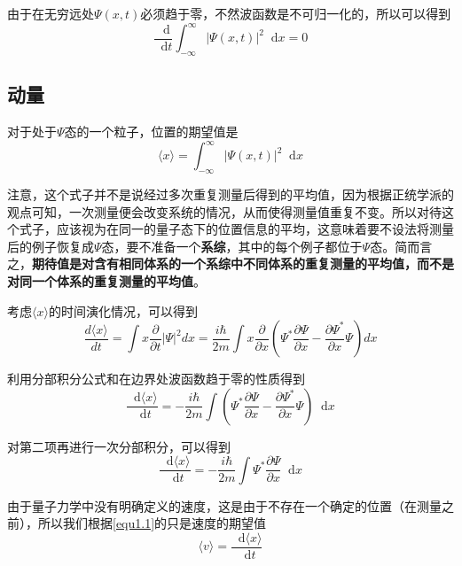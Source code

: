 \documentclass[UTF8]{ctexart}
\newcommand*{\dif}{\mathop{}\!\mathrm{d}}
\begin{document}
\noindent 由于在无穷远处$\Psi(x,t)$必须趋于零，不然波函数是不可归一化的，所以可以得到
    \begin{equation}
        \frac{\dif}{\dif t} \int_{-\infty}^{\infty} |\Psi(x,t)|^2 \dif x = 0 
    \end{equation}

    \subsection{动量}
    对于处于$\Psi$态的一个粒子，位置的期望值是
    \begin{equation}
        \langle x \rangle = \int_{-\infty}^{\infty} |\Psi (x,t)|^2 \dif x 
    \end{equation}

    注意，这个式子并不是说经过多次重复测量后得到的平均值，因为根据正统学派的观点可知，一次测量便会改变系统的情况，从而使得测量值重复不变。所以对待这个式子，应该视为在同一的量子态下的位置信息的平均，这意味着要不设法将测量后的例子恢复成$\Psi$态，要不准备一个\textbf{系综}，其中的每个例子都位于$\Psi$态。简而言之，\textbf{期待值是对含有相同体系的一个系综中不同体系的重复测量的平均值，而不是对同一个体系的重复测量的平均值}。

    考虑$\langle x \rangle$的时间演化情况，可以得到
    \begin{equation}
        \frac{d\langle x\rangle}{d t}=\int x \frac{\partial}{\partial t}|\Psi|^{2} d x=\frac{i \hbar}{2 m} \int x \frac{\partial}{\partial x}\left(\Psi^{*} \frac{\partial \Psi}{\partial x}-\frac{\partial \Psi^{*}}{\partial x} \Psi\right) d x
        \end{equation}

\noindent 利用分部积分公式和在边界处波函数趋于零的性质得到
    \begin{equation}
        \frac{\dif \langle x \rangle}{\dif t} = - \frac{i \hbar}{2m} \int \left(\Psi^* \frac{\partial \Psi}{\partial x} - \frac{\partial \Psi^*}{\partial x} \Psi\right) \dif x
    \end{equation}

\noindent 对第二项再进行一次分部积分，可以得到
    \begin{equation}
        \frac{\dif \langle x \rangle}{\dif t} = - \frac{i \hbar}{2m} \int \Psi^* \frac{\partial \Psi}{\partial x} \dif x \label{equ1.1}
    \end{equation}

    由于量子力学中没有明确定义的速度，这是由于不存在一个确定的位置（在测量之前），所以我们根据\autoref{equ1.1}的只是速度的期望值
    \begin{equation}
        \langle v \rangle = \frac{\dif \langle x \rangle}{\dif t}
    \end{equation}
\end{document}
